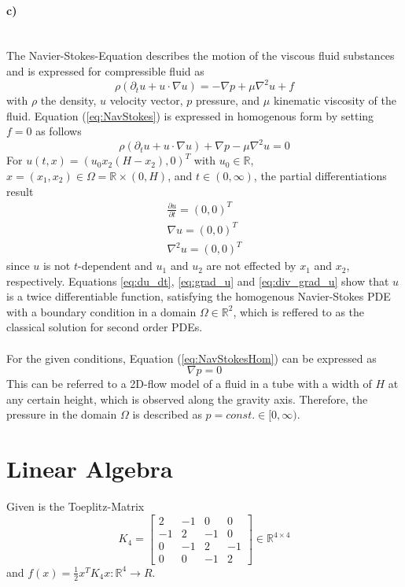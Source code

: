 \documentclass[a4paper]{article}
\newcommand{\R}{\mathbb{R}}
\newcommand*{\BMAT}[1]
{
	\begin{bmatrix}
		#1 
	\end{bmatrix}
}
\newcommand*{\EQ}[1]{Equation (\ref{eq:#1})}
\begin{document}
\paragraph{c)}\mbox{} \\
The Navier-Stokes-Equation describes the motion of the viscous fluid substances and is expressed for compressible fluid as
\begin{equation}
	\rho(\partial_t u + u \cdot \nabla u) = - \nabla p + \mu \nabla ^2 u + f
	\label{eq:NavStokes}
\end{equation}
with $\rho$ the density, $u$ velocity vector, $p$ pressure, and $\mu$ kinematic viscosity of the fluid.
\EQ{NavStokes} is expressed in homogenous form by setting $f = 0$ as follows
\begin{equation}
	\rho(\partial_t u + u \cdot \nabla u) + \nabla p - \mu \nabla ^2 u = 0
	\label{eq:NavStokesHom}
\end{equation}
For $u (t,x) = (u_0 x_2 (H - x_2), 0)^T$ with $u_0 \in \R$, $x = (x_ 1, x_2) \in \Omega = \R \times (0, H)$, and $t \in (0, \infty)$, the partial differentiations result
\begin{align}
	\frac{\partial u}{\partial t} = (0,0)^T \label{eq:du_dt}   \\
	\nabla u = (0,0)^T  					\label{eq:grad_u} \\
	\nabla^2 u = (0,0)^T  					\label{eq:div_grad_u}
\end{align}
%
since $u$ is not $t$-dependent and $u_1$ and $u_2$ are not effected by $x_1$ and $x_2$, respectively.
Equations \ref{eq:du_dt}, \ref{eq:grad_u} and \ref{eq:div_grad_u} show that $u$ is a twice differentiable function, satisfying the homogenous Navier-Stokes PDE with a boundary condition in a domain $\Omega \in \R^2$, which is reffered to as the classical solution for second order PDEs.
\\ \\
For the given conditions, \EQ{NavStokesHom} can be expressed as
\begin{equation}
	\nabla p = 0
\end{equation}
This can be referred to a 2D-flow model of a fluid in a tube with a width of $H$ at any certain height, which is observed along the gravity axis. Therefore, the pressure in the domain $\Omega$ is described as $p = const. \in [0, \infty)$. 
\section{Linear Algebra}
Given is the Toeplitz-Matrix
\begin{equation}
	K_4 = \BMAT{2 & -1 & 0 & 0\\
				-1 & 2 & -1 & 0\\
				0 & -1 & 2 & -1\\
				0 & 0 & -1 & 2} \in \R^{4 \times 4}
\end{equation}
and $f(x) = \frac{1}{2} x^T K_4 x: \R^4 \rightarrow R$.
\end{document}
